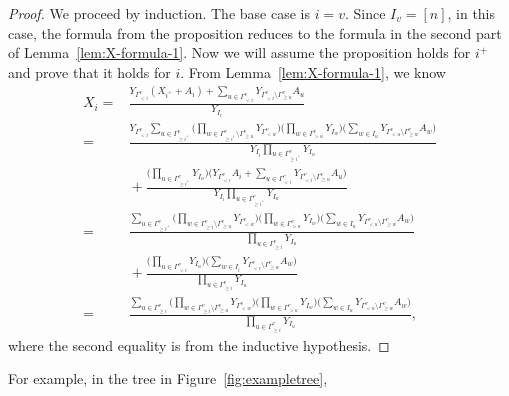 \documentclass[pdftex]{sigma}
\numberwithin{equation}{section}
\begin{document}
\begin{proof}
We proceed by induction. The base case is $i=v$. Since $I_v=[n]$, in this case, the formula from the proposition reduces to the formula in the second part of Lemma~\ref{lem:X-formula-1}.
Now we will assume the proposition holds for $i^+$ and prove that it holds for $i$. From Lemma~\ref{lem:X-formula-1}, we know
\begin{align*}
X_i={} & \frac{Y_{\Gamma_{< i}^v}(X_{i^+}+A_i)+\sum_{u\in \Gamma_{< i}^v}Y_{\Gamma_{< i}^v\setminus\Gamma_{\geq u}^v}A_u}{Y_{I_i}}\\
={} & \frac{Y_{\Gamma_{< i}^v}\sum_{u\in\Gamma_{\geq i^+}^v}\Big(\prod_{w\in\Gamma_{\geq i^+}^v\setminus\Gamma_{\geq u}^v} Y_{\Gamma_{< w}^v}\Big)\Big(\prod_{w\in\Gamma_{> u}^v} Y_{I_w}\Big)\Big(\sum_{w\in I_u}Y_{\Gamma_{< u}^v\setminus\Gamma_{\geq w}^v}A_w\Big)}{Y_{I_i}\prod_{u\in\Gamma_{\geq i^+}^v}Y_{I_u}} \\
&{}+ \frac{\Big(\prod_{u\in\Gamma_{\geq i^+}^v}Y_{I_u}\Big)\Big(Y_{\Gamma_{< i}^v}A_i+\sum_{u\in \Gamma_{< i}^v}Y_{\Gamma_{< i}^v\setminus\Gamma_{\geq u}^v}A_u\Big)}{Y_{I_i}\prod_{u\in\Gamma_{\geq i^+}^v}Y_{I_u}}\\
={} & \frac{\sum_{u\in\Gamma_{\geq i^+}^v}\Big(\prod_{w\in\Gamma_{\geq i}^v\setminus\Gamma_{\geq u}^v} Y_{\Gamma_{< w}^v}\Big)\Big(\prod_{w\in\Gamma_{> u}^v} Y_{I_w}\Big)\Big(\sum_{w\in I_u}Y_{\Gamma_{< u}^v\setminus\Gamma_{\geq w}^v}A_w\Big)}{\prod_{u\in\Gamma_{\geq i}^v}Y_{I_u}} \\
&{}+ \frac{\Big(\prod_{u\in\Gamma_{> i}^v}Y_{I_u}\Big)\Big(\sum_{w\in I_i}Y_{\Gamma_{< i}^v\setminus\Gamma_{\geq w}^v}A_w\Big)}{\prod_{u\in\Gamma_{\geq i}^v}Y_{I_u}}\\
={} & \frac{\sum_{u\in\Gamma_{\geq i}^v}\Big(\prod_{w\in\Gamma_{\geq i}^v\setminus\Gamma_{\geq u}^v} Y_{\Gamma_{< w}^v}\Big)\Big(\prod_{w\in\Gamma_{> u}^v} Y_{I_w}\Big)\Big(\sum_{w\in I_u}Y_{\Gamma_{< u}^v\setminus\Gamma_{\geq w}^v}A_w\Big)}{\prod_{u\in\Gamma_{\geq i}^v}Y_{I_u}},
\end{align*}
where the second equality is from the inductive hypothesis.
\end{proof}
For example, in the tree in Figure~\ref{fig:exampletree},
\end{document}
